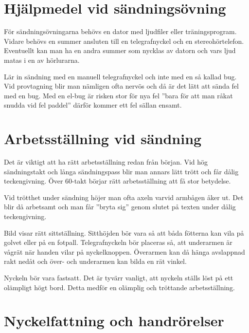 \section[Övningshjälpmedel]{Hjälpmedel vid sändningsövning}

För sändningsövningarna behövs en dator med ljudfiler eller träningsprogram.
Vidare behövs en summer ansluten till en telegrafnyckel och en stereohörtelefon.
Eventuellt kan man ha en andra summer som nycklas av datorn och vars ljud matas
i en av hörlurarna.

Lär in sändning med en manuell telegrafnyckel och inte med en så kallad bug.
Vid provtagning blir man nämligen ofta nervös och då är det lätt att sända fel
med en bug.
Med en el-bug är risken stor för nya fel ''bara för att man råkat snudda vid fel
paddel'' därför kommer ett fel sällan ensamt.


\section[Ställning]{Arbetsställning vid sändning}

Det är viktigt att ha rätt arbetsställning redan från början.
Vid hög sändningstakt och långa sändningspass blir man annars lätt trött och
får dålig teckengivning.
Över 60-takt börjar rätt arbetsställning att få stor betydelse.

Vid trötthet under sändning höjer man ofta axeln varvid armbågen åker ut.
Det blir då arbetsamt och man får ''bryta sig'' genom slutet på texten under
dålig teckengivning.

Bild  visar rätt sittställning.
Sitthöjden bör vara så att båda fötterna kan vila på golvet eller på en fotpall.
Telegrafnyckeln bör placeras så, att underarmen är vågrät när handen vilar på
nyckelknoppen.
Överarmen kan då hänga avslappnad rakt nedåt och över- och underarmen kan bilda
en rät vinkel.

Nyckeln bör vara fastsatt.
Det är tyvärr vanligt, att nyckeln ställs löst på ett olämpligt högt bord.
Detta medför en olämplig och tröttande arbetsställning.

\section[Fattning]{Nyckelfattning och handrörelser}

